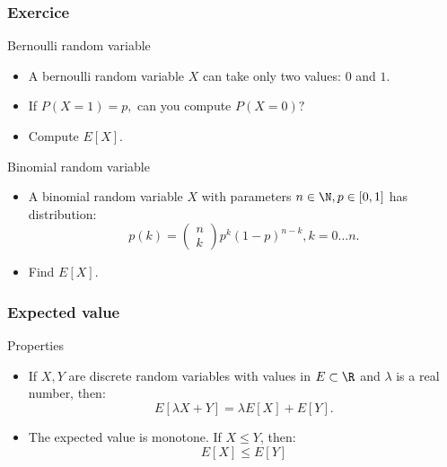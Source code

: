 \begin{frame}
    \frametitle{Exercice}
\begin{block}{Bernoulli random variable}
    \begin{itemize}
        \item<+-> A bernoulli random variable $X$ can take only two values: $0$ and $1$.
        \item<+-> If $P\left( X=1 \right)  = p, $ can you compute $P\left( X=0 \right) ?$
        \item<+-> Compute $E\left[ X \right].$
    \end{itemize}
\end{block}
\begin{block}{Binomial random variable}
    \begin{itemize}
        \item<+-> A binomial random variable $X$ with parameters $n \in \N, p \in [0,1]$ has 
        distribution:
        \begin{equation}
            p(k) = \begin{pmatrix}
                n \\ k
            \end{pmatrix} p^k \left( 1-p \right)^{n-k}, k = 0 \dots n.
        \end{equation}
        \item<+-> Find $E\left[ X \right].$
    \end{itemize}
\end{block}
    

\end{frame}
\begin{frame}
    \frametitle{Expected value}
\begin{block}{Properties}
    \begin{itemize}
        \item<+-> If $X,Y$ are discrete random variables with values in $E \subset \R$ and 
        $\lambda$ is a real number, then:
        \begin{equation}
            E\left[ \lambda X + Y \right] = \lambda E\left[ X \right] + E \left[ Y \right].
        \end{equation}
        \item<+-> The expected value is monotone. If $X \leq Y$, then:
        \begin{equation}
            E\left[ X \right] \leq E \left[ Y \right]
        \end{equation}
       
    \end{itemize}
\end{block}
\end{frame}
